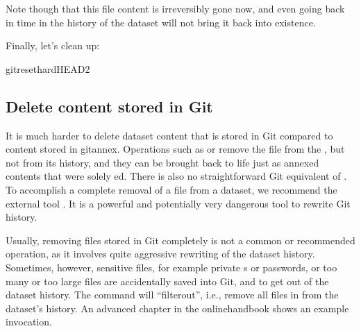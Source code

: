 \sphinxAtStartPar
Note though that this file content is irreversibly gone now, and
even going back in time in the history of the dataset will not bring it
back into existence.

\sphinxAtStartPar
Finally, let’s clean up:

\begin{sphinxVerbatim}[commandchars=\\\{\}]
gitreset\PYGZhy{}\PYGZhy{}hardHEAD\PYGZti{}2
\end{sphinxVerbatim}

\ignorespaces 

\subsection{Delete content stored in Git}
\label{\detokenize{basics/101-136-filesystem:delete-content-stored-in-git}}\label{\detokenize{basics/101-136-filesystem:index-17}}
\sphinxAtStartPar
It is much harder to delete dataset content that is stored in Git compared to
content stored in git\sphinxhyphen{}annex.
Operations such as  or  remove the file from the ,
but not from its history, and they can be brought back to life just as annexed
contents that were solely \textquotesingle{}ed. There is also no straightforward
Git equivalent of .
To accomplish a complete removal of a file from a dataset, we recommend the external tool
.
It is a powerful and potentially very dangerous tool to rewrite Git history.

\sphinxAtStartPar
Usually, removing files stored in Git completely
is not a common or recommended operation, as it involves quite aggressive
rewriting of the dataset history. Sometimes, however, sensitive files, for example
private {\hyperref[\detokenize{glossary:term-SSH-key}]{}}s or passwords, or too many or too large files are
accidentally saved into Git, and  to get out of the dataset history.
The command  will “filter\sphinxhyphen{}out”,
i.e., remove all files  in 
from the dataset’s history. An advanced chapter in the online\sphinxhyphen{}handbook
shows an example invocation.


